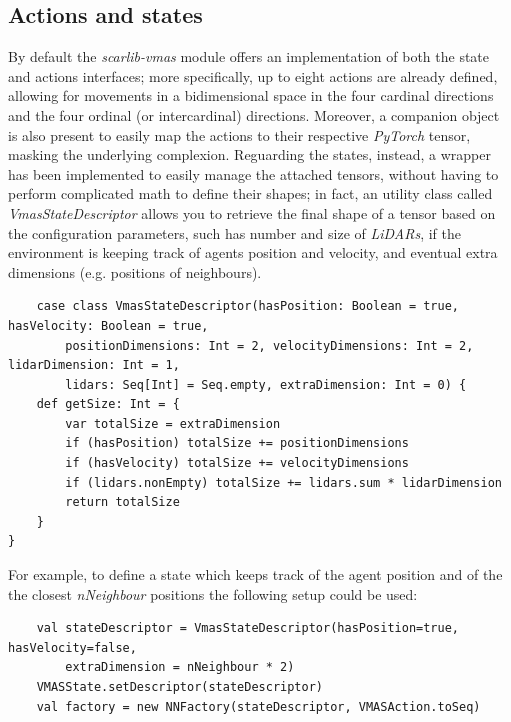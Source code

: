 \documentclass[12pt,a4paper,openright,twoside]{book}
\begin{document}
\subsection{Actions and states}
By default the \emph{scarlib-vmas} module offers an implementation of both the state and actions interfaces; more specifically, up to eight actions are already defined, allowing for movements in a bidimensional space in the four cardinal directions and the four ordinal (or intercardinal) directions.
Moreover, a companion object is also present to easily map the actions to their respective \emph{PyTorch} tensor, masking the underlying complexion.
Reguarding the states, instead, a wrapper has been implemented to easily manage the attached tensors, without having to perform complicated math to define their shapes; in fact, an utility class called \emph{VmasStateDescriptor} allows you to retrieve the final shape of a tensor based on the configuration parameters, such has number and size of \emph{LiDARs}, if the environment is keeping track of agents position and velocity, and eventual extra dimensions (e.g. positions of neighbours).

\begin{lstlisting}
    case class VmasStateDescriptor(hasPosition: Boolean = true, hasVelocity: Boolean = true, 
        positionDimensions: Int = 2, velocityDimensions: Int = 2, lidarDimension: Int = 1, 
        lidars: Seq[Int] = Seq.empty, extraDimension: Int = 0) {
    def getSize: Int = {
        var totalSize = extraDimension
        if (hasPosition) totalSize += positionDimensions
        if (hasVelocity) totalSize += velocityDimensions
        if (lidars.nonEmpty) totalSize += lidars.sum * lidarDimension
        return totalSize
    }
}
\end{lstlisting}

For example, to define a state which keeps track of the agent position and of the the closest \emph{nNeighbour} positions 
the following setup could be used:
\begin{lstlisting}
    val stateDescriptor = VmasStateDescriptor(hasPosition=true, hasVelocity=false, 
        extraDimension = nNeighbour * 2)
    VMASState.setDescriptor(stateDescriptor)
    val factory = new NNFactory(stateDescriptor, VMASAction.toSeq)
\end{lstlisting}
\end{document}
